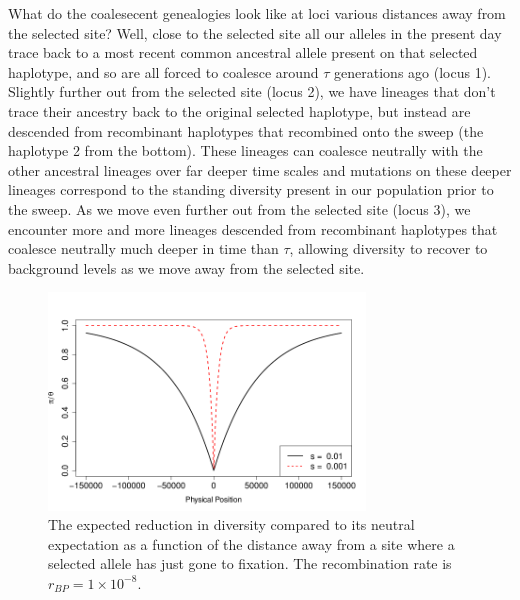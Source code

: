 What do the coalesecent genealogies look like at loci various distances away from the
selected site? Well, close to the selected site all our alleles in the
present day trace back to a most recent common ancestral allele
present on that selected haplotype, and so are all forced to coalesce
around $\tau$ generations ago (locus 1). Slightly further out from the selected
site (locus 2), we have lineages that don't trace their ancestry back
to the original selected haplotype, but instead are descended from
recombinant haplotypes that recombined onto the sweep (the haplotype 2 from the
bottom). These lineages can coalesce neutrally with the other ancestral lineages
over far deeper time scales and mutations on these deeper lineages
correspond to the standing diversity present in our population
prior to the sweep. As we move even further out from the selected site
(locus 3), we encounter more and more lineages descended from
recombinant haplotypes that coalesce neutrally much deeper in time than $\tau$, 
allowing diversity to recover to background levels as we move away
from the selected site.

\begin{figure}
\begin{center}
\includegraphics[width=0.75\textwidth]{figures/hitchhiking_reduction.png}
\end{center}
\caption{The expected reduction in diversity compared to its neutral expectation as
a function of the distance away from a site where a selected allele
has just gone to fixation. The recombination rate is $r_{BP}= 1\times
10^{-8}$.} \label{fig:hitchhiking_reduction}
\end{figure}


